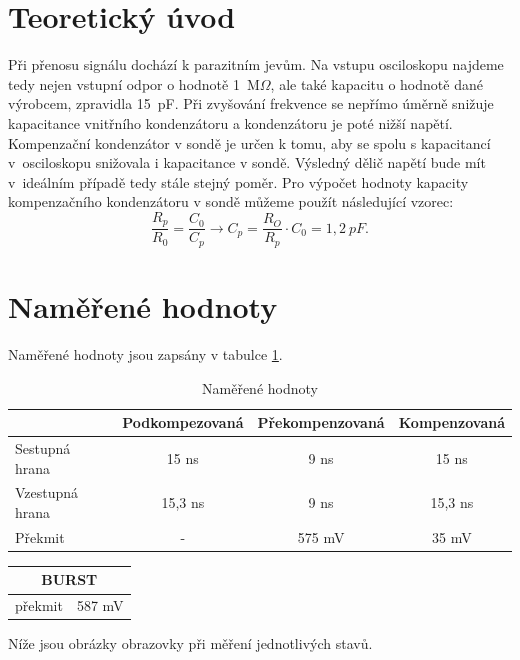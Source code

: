 \documentclass[a4paper,12pt]{article}   %
\newcommand{\tohm}{$\Omega$}
\begin{document}
\section{Teoretický úvod}
\label{chap:teoreticky_uvod}
Při přenosu signálu dochází k parazitním jevům. Na vstupu osciloskopu najdeme tedy nejen vstupní odpor o hodnotě 1~M\tohm , ale také kapacitu o hodnotě dané výrobcem, zpravidla 15~pF. Při zvyšování frekvence se nepřímo úměrně snižuje kapacitance vnitřního kondenzátoru a kondenzátoru je poté nižší napětí. Kompenzační kondenzátor v sondě je určen k tomu, aby se spolu s kapacitancí v~osciloskopu snižovala i kapacitance v sondě. Výsledný dělič napětí bude mít v~ideálním případě tedy stále stejný poměr. Pro výpočet hodnoty kapacity kompenzačního kondenzátoru v sondě můžeme použít následující vzorec:
\begin{equation}
  \frac{R_p}{R_0} = \frac{C_0}{C_p} \rightarrow C_p=\frac{R_O}{R_p}\cdot C_0 = 1,2~pF.
  \label{eq:komp_final}
\end{equation}


\section{Naměřené hodnoty}
\label{chap:namerene_hodnoty}
Naměřené hodnoty jsou zapsány v tabulce \ref{tab:hodnoty}.

\begin{table}[h!]
  \centering
  \begin{tabular}{|l|c||c||c|}
    \hline
    &Podkompezovaná&Překompenzovaná &Kompenzovaná\\\hline
    Sestupná hrana &15 ns&9 ns&15 ns\\\hline
    Vzestupná hrana&15,3 ns&9 ns&15,3 ns\\\hline
    Překmit&-&575 mV&35 mV\\\hline
  \end{tabular}
  \caption{Naměřené hodnoty}
  \label{tab:hodnoty}
\end{table}

\begin{table}[h!]
  \centering
  \begin{tabular}{|c|c|}
    \hline
    \multicolumn{2}{|c|}{BURST}\\\hline
    překmit&587 mV\\\hline
  \end{tabular}
\end{table}

Níže jsou obrázky obrazovky při měření jednotlivých stavů.
\end{document}
